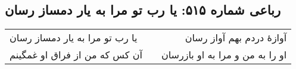 \begin{center}
\section*{رباعی شماره ۵۱۵: یا رب تو مرا به یار دمساز رسان}
\label{sec:sh515}
\begin{longtable}{l p{0.5cm} r}
یا رب تو مرا به یار دمساز رسان
&&
آوازهٔ دردم بهم آواز رسان
\\
آن کس که من از فراق او غمگینم
&&
او را به من و مرا به او بازرسان
\\
\end{longtable}
\end{center}
